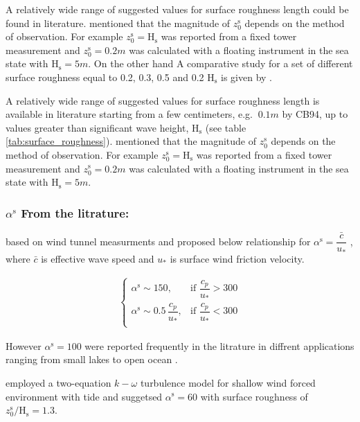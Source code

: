 \documentclass[final]{svjour3}
\begin{document}
{A relatively wide range of suggested values for surface roughness length could be found in literature. \cite{stips2005m}
mentioned that the magnitude of $z_0^\mathrm{s}$ depends on the method of observation. For example $z_0^\mathrm{s}=\mathrm{H}_\mathrm{s}$ was reported
from a fixed tower measurement and $z_0^\mathrm{s}=0.2m$ was calculated with a floating instrument in the sea state with
$\mathrm{H}_\mathrm{s}=5m$. On the other hand 
A comparative study for a set of different surface roughness equal to 0.2, 0.3, 0.5 and 0.2 $\mathrm{H}_\mathrm{s}$ is given by
\cite{newberger2007forcing2}.  

A relatively wide range of suggested values for surface
roughness length is available in  literature starting from a few centimeters,
e.g. $ ~ 0.1m$ by CB94, up to values greater than significant wave height, $\mathrm{H}_\mathrm{s}$
(see table \ref{tab:surface_roughness}).  \cite{stips2005m} mentioned that the
magnitude of  $z_0^\mathrm{s}$ depends on the method of observation. For example
$z_0^\mathrm{s}=\mathrm{H}_\mathrm{s}$ was reported from a fixed tower measurement and $z_0^\mathrm{s}=0.2m$ was
calculated with a floating instrument in the sea state with $\mathrm{H}_\mathrm{s}=5m$.  





\subsubsection{$\alpha^\mathrm{s}$ From the litrature:}
\cite{craig1996velocity} based on wind tunnel measurments and
\cite{Terrayetal96} proposed below relationship for $\alpha^\mathrm{s}=\dfrac{\bar{c}}{u_*}$ , where $\bar{c}$ is
effective wave speed and $u_*$ is surface wind friction velocity.
 
\begin{align}
\begin{cases}
\alpha^\mathrm{s} \sim 150 , & \text{if } \dfrac{c_p}{u_*} > 300 \\
\alpha^\mathrm{s} \sim 0.5\, \dfrac{c_p}{u_*} , & \text{if } \dfrac{c_p}{u_*} < 300 \\
\end{cases}
\end{align}

However $\alpha^\mathrm{s}=100$ were reported frequently in the litrature
in diffrent applications ranging from small lakes to open ocean
\citep{burchard2001simulating,Umlauf03a,kantha2004effect,stips2005m}.

\cite{jones2008influence} employed a two-equation $k-\omega$ turbulence model
for shallow wind forced environment with tide and suggetsed $\alpha^\mathrm{s}=60$ with
surface roughness of ${z_0^\mathrm{s}} / {\mathrm{H}_\mathrm{s}} = 1.3$.

}
\end{document}
